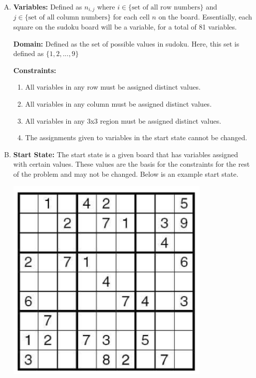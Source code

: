\documentclass[10pt,a4paper]{article}
\begin{document}
	
	\begin{enumerate}[A.]

		\item
		
		\textbf{Variables:} Defined as $n_{i,j}$ where $i \in \text{\{set of all row numbers\}}$ and $j \in \text{\{set of all column numbers\}}$ for each cell $n$ on the board. Essentially, each square on the sudoku board will be a variable, for a total of 81 variables.
		
		\textbf{Domain:} Defined as the set of possible values in sudoku. Here, this set is defined as $\{ 1, 2, ..., 9 \}$
		
		\textbf{Constraints:}
		
		\begin{enumerate}[1.]
			\item All variables in any row must be assigned distinct values.
			\item All variables in any column must be assigned distinct values.
			\item All variables in any 3x3 region must be assigned distinct values.
			\item The assignments given to variables in the start state cannot be changed.
		\end{enumerate}
		
		\item
		
		\textbf{Start State:} The start state is a given board that has variables assigned with certain values. These values are the basis for the constraints for the rest of the problem and may not be changed. Below is an example start state.
		
		\begin{center}
			\includegraphics[scale=0.4]{sudoku_startstate}
		\end{center}
		

\end{enumerate}
\end{document}
